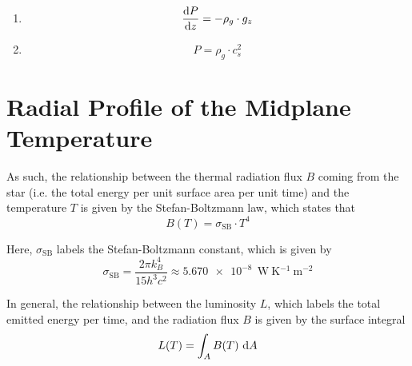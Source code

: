 \begin{enumerate}
        \item {}
            \begin{equation}
                \deriv{P}{z} = - \rho_g \cdot g_z  %
            \end{equation}
    
        \item {}
            \begin{equation}
                \label{eq:isothermal_condition}
                P = \rho_g \cdot c_s^2
            \end{equation}
    
    \end{enumerate}
    
    
    

\clearpage\section{Radial Profile of the Midplane Temperature}

     As such, the relationship between the
    thermal radiation flux $B$ coming from the star (i.e. the total energy per unit surface area 
    per unit time) and the temperature $T$ is given by the Stefan-Boltzmann law, which states that
    \begin{equation}
        \label{eq:stefan_boltzmann_law}
        B(T) = \sigma_\text{SB}\cdot T^4   %
    \end{equation}

    Here, $\sigma_\text{SB}$ labels the Stefan-Boltzmann constant, which is given by 
    \begin{equation}
        \sigma_\text{SB}
            = \frac{2\pi k_B^4}{15h^3 c^2}
            \approx \SI{5.670e-8}{\ \watt\ \kelvin^{-1}\ \meter^{-2}}
    \end{equation}

    In general, the relationship between the luminosity $L$, which labels the total emitted energy 
    per time, and the radiation flux $B$ is given by the surface integral
    \begin{equation}
        L(T) = \int_A B(T) \ \text dA
    \end{equation}
    
